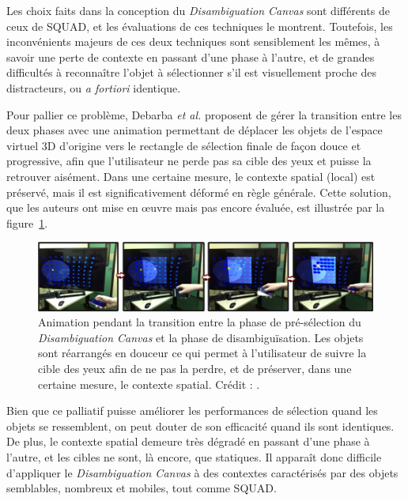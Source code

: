 	Les choix faits dans la conception du \emph{Disambiguation Canvas} sont différents de ceux de SQUAD, et les évaluations de ces techniques le montrent. Toutefois, les inconvénients majeurs de ces deux techniques sont sensiblement les mêmes, à savoir une perte de contexte en passant d'une phase à l'autre, et de grandes difficultés à reconnaître l'objet à sélectionner s'il est visuellement proche des distracteurs, ou \emph{a fortiori} identique.
	
	Pour pallier ce problème, Debarba \emph{et al.} proposent de gérer la transition entre les deux phases avec une animation permettant de déplacer les objets de l'espace virtuel 3D d'origine vers le rectangle de sélection finale de façon \og douce \fg{} et progressive, afin que l'utilisateur ne perde pas sa cible des yeux et puisse la retrouver aisément. Dans une certaine mesure, le contexte spatial (local) est préservé, mais il est significativement déformé en règle générale. Cette solution, que les auteurs ont mise en \oe{}uvre mais pas encore évaluée, est illustrée par la figure~\ref{fig:dCanvasContext}.
	
	\begin{figure}[!htb]
		\centering
		\includegraphics[width=\textwidth]{figures/ch2/dCanvasContext}
		\caption[\emph{Disambiguation Canvas} -- animation de transition]{Animation pendant la transition entre la phase de pré-sélection du \emph{Disambiguation Canvas} et la phase de disambiguïsation. Les objets sont réarrangés \og en douceur \fg{} ce qui permet à l'utilisateur de suivre la cible des yeux afin de ne pas la perdre, et de préserver, dans une certaine mesure, le contexte spatial. Crédit : \cite{debarba2013disambiguation}.}
		\label{fig:dCanvasContext}
	\end{figure}
	
	Bien que ce palliatif puisse améliorer les performances de sélection quand les objets se ressemblent, on peut douter de son efficacité quand ils sont identiques. De plus, le contexte spatial demeure très dégradé en passant d'une phase à l'autre, et les cibles ne sont, là encore, que statiques. Il apparaît donc difficile d'appliquer le \emph{Disambiguation Canvas} à des contextes caractérisés par des objets semblables, nombreux et mobiles, tout comme SQUAD.
	
